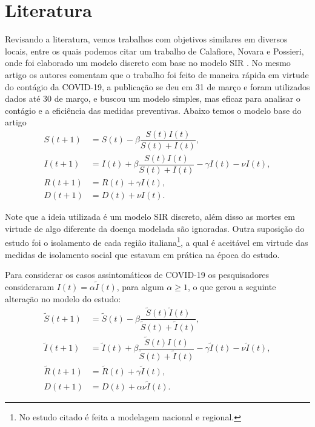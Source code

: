 \documentclass{article}
\begin{document}
\section{Literatura}
Revisando a literatura, vemos trabalhos com objetivos similares em diversos locais, entre os quais podemos citar um trabalho de Calafiore, Novara e Possieri, onde foi elaborado um modelo discreto com base no modelo SIR \cite{calafiore2020modified}. No mesmo artigo os autores comentam que o trabalho foi feito de maneira rápida em virtude do contágio da COVID-19, a publicação se deu em 31 de março e foram utilizados dados até 30 de março, e buscou um modelo simples, mas eficaz para analisar o contágio e a eficiência das medidas preventivas. Abaixo temos o modelo base do artigo
\begin{equation*}
    \begin{split}
        S(t + 1) & = S(t) - \beta \dfrac{S(t) I(t)}{S(t) + I(t)}, \\
        I(t + 1) & = I(t) + \beta \dfrac{S(t) I(t)}{S(t) + I(t)} - \gamma I(t) - \nu I(t), \\
        R(t + 1) & = R(t) + \gamma I(t), \\
        D(t + 1) & = D(t) + \nu I(t).
    \end{split}
\end{equation*}

Note que a ideia utilizada é um modelo SIR discreto, além disso as mortes em virtude de algo diferente da doença modelada são ignoradas. Outra suposição do estudo foi o isolamento de cada região italiana\footnote{No estudo citado é feita a modelagem nacional e regional.}, a qual é aceitável em virtude das medidas de isolamento social que estavam em prática na época do estudo.

Para considerar os casos assintomáticos de COVID-19 os pesquisadores consideraram $I(t) = \alpha\tilde{I}(t)$, para algum $\alpha \geq 1$, o que gerou a seguinte alteração no modelo do estudo:
\begin{equation*}
    \begin{split}
        \tilde{S}(t + 1) & = \tilde{S}(t) - \beta \dfrac{\tilde{S}(t) \tilde{I}(t)}{\tilde{S}(t) + \tilde{I}(t)}, \\
        \tilde{I}(t + 1) & = \tilde{I}(t) + \beta \dfrac{\tilde{S}(t) I(t)}{\tilde{S}(t) + \tilde{I}(t)} - \gamma \tilde{I}(t) - \nu \tilde{I}(t), \\
        \tilde{R}(t + 1) & = \tilde{R}(t) + \gamma \tilde{I}(t), \\
        D(t + 1) & = D(t) + \alpha \nu \tilde{I}(t).
    \end{split}
\end{equation*}
\end{document}
